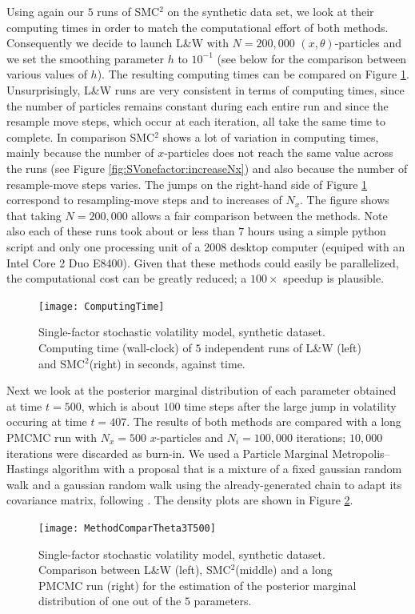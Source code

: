 \documentclass{statsoc}
\newcommand{\SMCSQ}{SMC$^2$\xspace}
\begin{document}
Using again our $5$ runs of \SMCSQ on the synthetic data set, we look at their computing times in order to match the computational
effort of both methods. Consequently we decide to launch L\&W with $N = 200,000$ $(x,\theta)$-particles and we set the smoothing parameter $h$ to $10^{-1}$ (see below for the comparison between various values of $h$). The resulting computing times can be compared on Figure \ref{fig:SVonefactor:CT}. Unsurprisingly, L\&W 
runs are very consistent in terms of computing times, since the number of particles remains constant during each entire run and since the resample move steps, which occur at each iteration, all take the same time to complete. In comparison \SMCSQ shows a lot of variation in computing times, mainly because the number of $x$-particles does not reach the same value across the runs (see Figure \ref{fig:SVonefactor:increaseNx}) and also because the number of resample-move steps varies. The jumps on the right-hand side of Figure \ref{fig:SVonefactor:CT} correspond to resampling-move steps and to  increases of $N_x$. The figure shows that taking $N = 200,000$ allows a fair comparison between the methods.
Note also each of these runs took about or less than $7$ hours using a simple python script and only one processing unit of a 2008 desktop computer (equiped with an Intel Core 2 Duo E8400). Given that these methods could easily be parallelized, the computational cost can be greatly reduced; a $100\times$ speedup is plausible.
\begin{figure}[H]
  \centering
  \texttt{[image: ComputingTime]}
  \caption{\label{fig:SVonefactor:CT} Single-factor stochastic volatility model, synthetic dataset. Computing time (wall-clock) of $5$ independent runs of L\&W (left) and \SMCSQ (right) in seconds, against time.}
\end{figure}
Next we look at the posterior marginal distribution of each parameter obtained at time $t = 500$, which is about $100$ time steps after the large jump in volatility occuring at time $t = 407$. The results of both methods
are compared with a long PMCMC run with $N_x = 500$ $x$-particles and $N_i = 100,000$ iterations; $10,000$ iterations were discarded as burn-in. We used a Particle Marginal Metropolis--Hastings algorithm with a proposal
that is a mixture of a fixed gaussian random walk and a gaussian random walk using the already-generated chain to adapt its covariance matrix, following \cite{PetersHosackHayes}.
 The density plots are shown in Figure \ref{fig:SVonefactor:compareLW}.
\begin{figure}[H]
 \centering
  \texttt{[image: MethodComparTheta3T500]}
 \caption{\label{fig:SVonefactor:compareLW} Single-factor stochastic volatility model, synthetic dataset.
Comparison between L\&W (left), \SMCSQ (middle) and a long PMCMC run (right) for the estimation of the posterior
marginal distribution of one out of the $5$ parameters.}
\end{figure}
\end{document}
